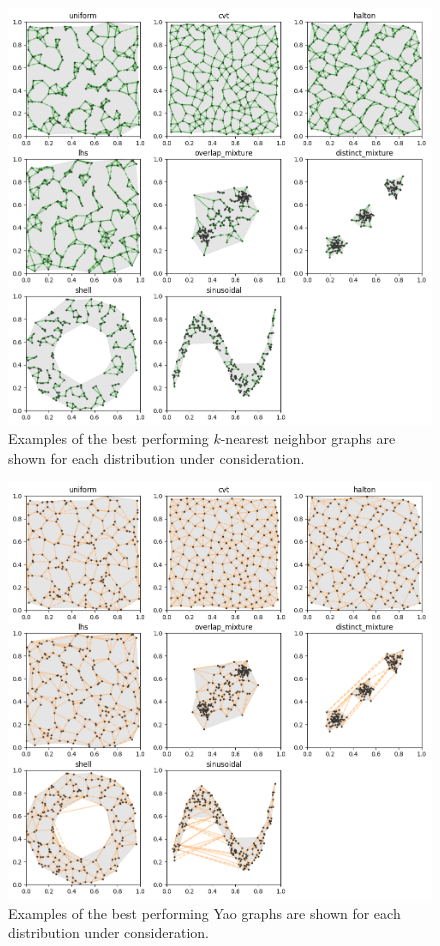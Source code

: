 \begin{figure}[htbp]
    \centering
    \includegraphics[width=\linewidth]{figs/chap7/k_quality.png}
    \caption[Optimal $k$-nn graphs for various two-dimensional distributions]{Examples of the best performing $k$-nearest neighbor graphs are shown for each distribution under consideration.}
    \label{fig:k_quality}
\end{figure}
\begin{figure}[htbp]
    \centering
    \includegraphics[width=\linewidth]{figs/chap7/yao_quality.png}
    \caption[Optimal Yao graphs for various two-dimensional distributions]{Examples of the best performing Yao graphs are shown for each distribution under consideration.}
    \label{fig:yao_quality}
\end{figure}

